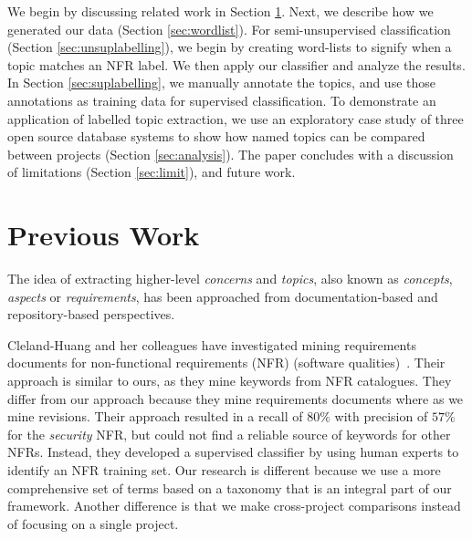 \documentclass[smallextended]{svjour3}       %
\begin{document}
We begin by discussing related work in Section \ref{sec:related}.
Next, we describe how we generated our data (Section \ref{sec:wordlist}). For semi-unsupervised classification (Section \ref{sec:unsuplabelling}), we
begin by creating word-lists to signify when a topic matches an NFR label. We then apply our classifier and analyze the results. 
In Section \ref{sec:suplabelling}, we manually annotate the topics, and use those annotations as training data for supervised classification.  
To demonstrate an application of labelled topic extraction, we use an exploratory case study of three open source database systems to show how named
topics can be compared between projects  (Section \ref{sec:analysis}). 
The paper concludes with a discussion of limitations (Section \ref{sec:limit}), and future work.

\section{Previous Work}
\label{sec:related}

The idea of extracting higher-level \emph{concerns} and \emph{topics}, also known as
 \emph{concepts}, \emph{aspects} or \emph{requirements},
has been approached from documentation-based and repository-based
perspectives.

Cleland-Huang and her colleagues have investigated mining requirements
documents for non-functional requirements (NFR) (software
qualities)~\cite{Cleland-Huang2006}.  Their approach is similar to
ours, as they mine keywords from NFR catalogues.  They differ from our approach because
they mine requirements documents where as we mine revisions.
Their approach resulted in a recall of $80\%$ with precision of $57\%$ for the \emph{security} NFR, but could not find a reliable source of keywords for other NFRs. 
Instead, they developed a supervised classifier by using human experts to identify an NFR training set. 
Our research is different because we use a more comprehensive set of terms based on a taxonomy that is an integral part of our framework.
Another difference is that we make cross-project comparisons instead of focusing
on a single project.
\end{document}

